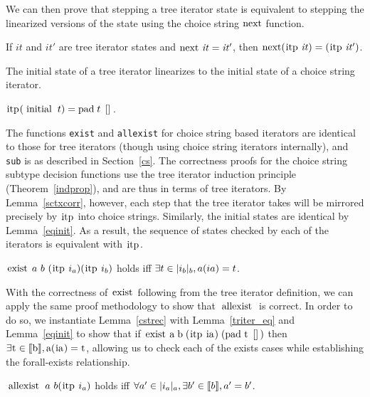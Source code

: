 \documentclass[a4paper,english]{lipics-v2019}
\newcommand{\denotes}[1]{\llbracket #1 \rrbracket}
\renewcommand{\c}[1]{\ensuremath{\text{\lstinline{#1}}}\xspace}
\begin{document}
\noindent
We can then prove that stepping a tree iterator state is equivalent to
stepping the linearized versions of the state using the choice string
\c{next} function.

\begin{lemma}\label{sctxcorr}
If $\mathit{it}$ and $\mathit{it'}$ are tree iterator states and
$\c{next}~\mathit{it}=\mathit{it}'$, then $\c{next} (\c{itp}\;\mathit{it}) =
(\c{itp}\;\mathit{it'})$.
\end{lemma}
\noindent
The initial state of a tree iterator linearizes to the
initial state of a choice string iterator.

\begin{lemma}\label{eqinit}
$\c{itp} (\c{initial}\;t) = \c{pad}\;t\;\c{[]}$.
\end{lemma}

\noindent
The functions \verb|exist| and \verb|allexist| for choice string based
iterators are identical to those for tree iterators (though using choice
string iterators internally), and \verb|sub| is as described in
Section~\ref{cs}. The correctness proofs for the choice string subtype
decision functions use the tree iterator induction principle
(Theorem~\ref{indprop}), and are thus in terms of tree iterators. By
Lemma~\ref{sctxcorr}, however, each step that the tree iterator takes will be
mirrored precisely by \c{itp} into choice strings. Similarly, the initial states
are identical by Lemma~\ref{eqinit}. As a result, the sequence of states
checked by each of the iterators is equivalent with \c{itp}.

\begin{lemma}\label{cstrec}
$\c{exist}~a~b~(\c{itp}~i_a) (\c{itp}~i_b)$ holds iff $\exists t \in
  |i_b|_{b}, a(ia)=t$.
\end{lemma}

\noindent With the correctness of \c{exist} following from the tree iterator
definition, we can apply the same proof methodology to show that \c{allexist}
is correct. In order to do so, we instantiate Lemma~\ref{cstrec}  with
Lemma~\ref{triter_eq} and Lemma~\ref{eqinit} to show that if $\c{exist}\;\c
a\;\c b\;(\c{itp}\;\c{ia})\;(\c{pad}\;\c t\;\c{[]})$ then $\exists \c t \in
\denotes{\c b}, \c a(\c{ia}) = \c t$, allowing us to check  each of the exists
cases while establishing the forall-exists relationship.

\begin{lemma}\label{cstraec}
$\c{allexist}~a~b (\c{itp}~i_a)$
 holds iff $\forall a'\in\irch{i_a}{a}, \exists b'\in\denotes{b},a'=b'$.
\end{lemma}
\end{document}
